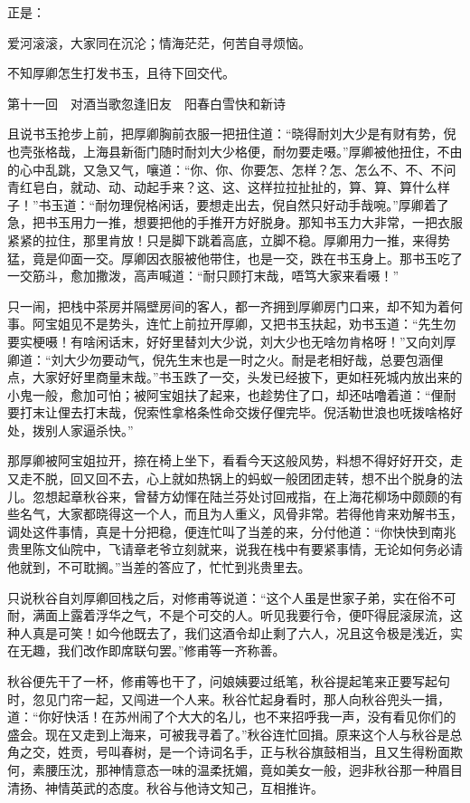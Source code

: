\documentclass[12pt,UTF8]{ctexbook}
\begin{document}
{{{正是：

爱河滚滚，大家同在沉沦；情海茫茫，何苦自寻烦恼。

不知厚卿怎生打发书玉，且待下回交代。





第十一回　对酒当歌忽逢旧友　阳春白雪快和新诗





且说书玉抢步上前，把厚卿胸前衣服一把扭住道：“晓得耐刘大少是有财有势，倪也壳张格哉，上海县新衙门随时耐刘大少格便，耐勿要走嗫。”厚卿被他扭住，不由的心中乱跳，又急又气，嚷道：“你、你、你要怎、怎样？怎、怎么不、不、不问青红皂白，就动、动、动起手来？这、这、这样拉拉扯扯的，算、算、算什么样子！”书玉道：“耐勿理倪格闲话，要想走出去，倪自然只好动手哉啘。”厚卿着了急，把书玉用力一推，想要把他的手推开方好脱身。那知书玉力大非常，一把衣服紧紧的拉住，那里肯放！只是脚下跳着高底，立脚不稳。厚卿用力一推，来得势猛，竟是仰面一交。厚卿因衣服被他带住，也是一交，跌在书玉身上。那书玉吃了一交筋斗，愈加撒泼，高声喊道：“耐只顾打末哉，唔笃大家来看嗫！”

只一闹，把栈中茶房并隔壁房间的客人，都一齐拥到厚卿房门口来，却不知为着何事。阿宝姐见不是势头，连忙上前拉开厚卿，又把书玉扶起，劝书玉道：“先生勿要实梗嗫！有啥闲话末，好好里替刘大少说，刘大少也无啥勿肯格呀！”又向刘厚卿道：“刘大少勿要动气，倪先生末也是一时之火。耐是老相好哉，总要包涵俚点，大家好好里商量末哉。”书玉跌了一交，头发已经披下，更如枉死城内放出来的小鬼一般，愈加可怕；被阿宝姐扶了起来，也趁势住了口，却还咕噜着道：“俚耐要打末让俚去打末哉，倪索性拿格条性命交拨仔俚完毕。倪活勒世浪也呒拨啥格好处，拨别人家逼杀快。”

那厚卿被阿宝姐拉开，捺在椅上坐下，看看今天这般风势，料想不得好好开交，走又走不脱，回又回不去，心上就如热锅上的蚂蚁一般团团走转，想不出个脱身的法儿。忽想起章秋谷来，曾替方幼惲在陆兰芬处讨回戒指，在上海花柳场中颇颇的有些名气，大家都晓得这一个人，而且为人重义，风骨非常。若得他肯来劝解书玉，调处这件事情，真是十分把稳，便连忙叫了当差的来，分付他道：“你快快到南兆贵里陈文仙院中，飞请章老爷立刻就来，说我在栈中有要紧事情，无论如何务必请他就到，不可耽搁。”当差的答应了，忙忙到兆贵里去。

只说秋谷自刘厚卿回栈之后，对修甫等说道：“这个人虽是世家子弟，实在俗不可耐，满面上露着浮华之气，不是个可交的人。听见我要行令，便吓得屁滚尿流，这种人真是可笑！如今他既去了，我们这酒令却止剩了六人，况且这令极是浅近，实在无趣，我们改作即席联句罢。”修甫等一齐称善。

秋谷便先干了一杯，修甫等也干了，问娘姨要过纸笔，秋谷提起笔来正要写起句时，忽见门帘一起，又闯进一个人来。秋谷忙起身看时，那人向秋谷兜头一揖，道：“你好快活！在苏州闹了个大大的名儿，也不来招呼我一声，没有看见你们的盛会。现在又走到上海来，可被我寻着了。”秋谷连忙回揖。原来这个人与秋谷是总角之交，姓贡，号叫春树，是一个诗词名手，正与秋谷旗鼓相当，且又生得粉面欺何，素腰压沈，那神情意态一味的温柔抚媚，竟如美女一般，迥非秋谷那一种眉目清扬、神情英武的态度。秋谷与他诗文知己，互相推许。

}}}
\end{document}
